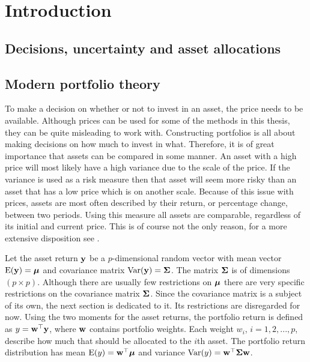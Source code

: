 \documentclass[12pt, twoside]{book}\usepackage{knitr}
\begin{document}
\newpage

\tableofcontents

\mainmatterSU
\part{Introduction}
\chapter{Decisions, uncertainty and asset allocations}\label{ch:intro}

\chapter{Modern portfolio theory}\label{ch:MPT}


To make a decision on whether or not to invest in an asset, the price needs to be available.
Although prices can be used for some of the methods in this thesis, they can be quite misleading to work with.
Constructing portfolios is all about making decisions on how much to invest in what.
Therefore, it is of great importance that assets can be compared in some manner. 
An asset with a high price will most likely have a high variance due to the scale of the price. 
If the variance is used as a risk measure then that asset will seem more risky than an asset that has a low price which is on another scale.
Because of this issue with prices, assets are most often described by their return, or percentage change, between two periods. 
Using this measure all assets are comparable, regardless of its initial and current price.
This is of course not the only reason, for a more extensive disposition see \citet[ch. 1]{tsay2005analysis}.

Let the asset return $\mathbf{y}$ be a $p$-dimensional random vector with mean vector $\operatorname{E}(\mathbf{y})=\mbox{\boldmath$\mu$}$ and covariance matrix $\operatorname{Var}(\mathbf{y})=\mathbf{\Sigma}$. 
The matrix $\mathbf{\Sigma}$ is of dimensions $(p \times p)$. 
Although there are usually few restrictions on $\mbox{\boldmath$\mu$}$ there are very specific restrictions on the covariance matrix $\mathbf{\Sigma}$. 
Since the covariance matrix is a subject of its own, the next section is dedicated to it.
Its restrictions are disregarded for now.
Using the two moments for the asset returns, the portfolio return is defined as $y = \mathbf{w}^\top \mathbf{y}$, where $\mathbf{w}$ contains portfolio weights.
Each weight $w_i$, $i=1,2,...,p$, describe how much that should be allocated to the $i$th asset.
The portfolio return distribution has mean $\operatorname{E}(y)=\mathbf{w}^\top \mbox{\boldmath$\mu$}$ and variance $\operatorname{Var}(y)=\mathbf{w}^\top \mathbf{\Sigma} \mathbf{w}$. 
\end{document}
